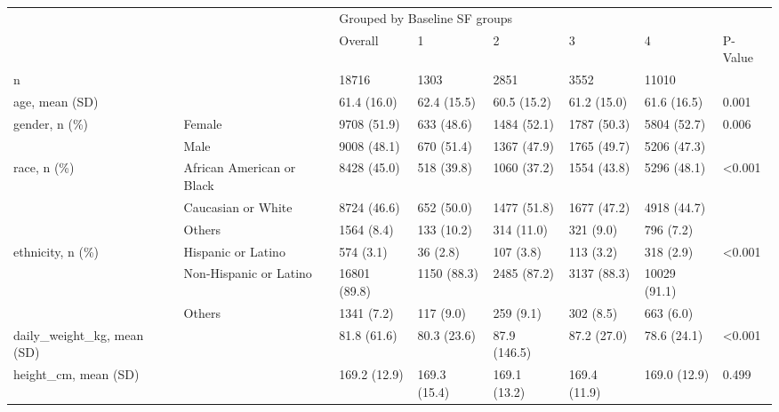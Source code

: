 \begin{tabular}{llllllll}
\toprule
                                 &        & \multicolumn{6}{l}{Grouped by Baseline SF groups} \\
                                 &        &                       Overall &              1 &              2 &              3 &              4 & P-Value \\
\midrule
n & {} &                         18716 &           1303 &           2851 &           3552 &          11010 &         \\
age, mean (SD) &        &                   61.4 (16.0) &    62.4 (15.5) &    60.5 (15.2) &    61.2 (15.0) &    61.6 (16.5) &   0.001 \\
gender, n (\%) & Female &                   9708 (51.9) &     633 (48.6) &    1484 (52.1) &    1787 (50.3) &    5804 (52.7) &   0.006 \\
                                 & Male &                   9008 (48.1) &     670 (51.4) &    1367 (47.9) &    1765 (49.7) &    5206 (47.3) &         \\
race, n (\%) & African American  or Black &                   8428 (45.0) &     518 (39.8) &    1060 (37.2) &    1554 (43.8) &    5296 (48.1) &  <0.001 \\
                                 & Caucasian or White &                   8724 (46.6) &     652 (50.0) &    1477 (51.8) &    1677 (47.2) &    4918 (44.7) &         \\
                                 & Others &                    1564 (8.4) &     133 (10.2) &     314 (11.0) &      321 (9.0) &      796 (7.2) &         \\
ethnicity, n (\%) & Hispanic or Latino &                     574 (3.1) &       36 (2.8) &      107 (3.8) &      113 (3.2) &      318 (2.9) &  <0.001 \\
                                 & Non-Hispanic or Latino &                  16801 (89.8) &    1150 (88.3) &    2485 (87.2) &    3137 (88.3) &   10029 (91.1) &         \\
                                 & Others &                    1341 (7.2) &      117 (9.0) &      259 (9.1) &      302 (8.5) &      663 (6.0) &         \\
daily\_weight\_kg, mean (SD) &        &                   81.8 (61.6) &    80.3 (23.6) &   87.9 (146.5) &    87.2 (27.0) &    78.6 (24.1) &  <0.001 \\
height\_cm, mean (SD) &        &                  169.2 (12.9) &   169.3 (15.4) &   169.1 (13.2) &   169.4 (11.9) &   169.0 (12.9) &   0.499 \\

\end{tabular}
